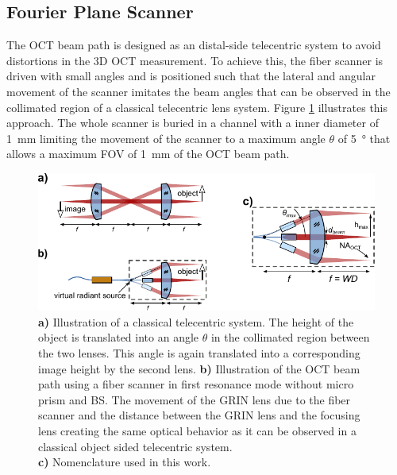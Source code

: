 \subsection{Fourier Plane Scanner}



The OCT beam path is designed as an distal-side telecentric system to avoid distortions in the 3D OCT measurement. To achieve this, the fiber scanner is driven with small angles and is positioned such that the lateral and angular movement of the scanner imitates the beam angles that can be observed in the collimated region of a classical telecentric lens system. Figure \ref{fig:fps} illustrates this approach. The whole scanner is buried in a channel with a inner diameter of \SI{1}{\milli\meter} limiting the movement of the scanner to a maximum angle $\theta$ of \SI{5}{\degree} that allows a maximum FOV of \SI{1}{\milli\meter} of the OCT beam path.



\begin{figure}[h!]\centering \includegraphics[width=\columnwidth]{figures/30_DesignSimulation/fps.pdf}
      \caption{\textbf{a)} Illustration of a classical telecentric system. The height of the object is translated into an angle $\theta$ in the collimated region between the two lenses. This angle is again translated into a corresponding image height by the second lens.
      \textbf{b)} Illustration of the OCT beam path using a fiber scanner in first resonance mode without micro prism and BS. The movement of the GRIN lens due to the fiber scanner and the distance between the GRIN lens and the focusing lens creating the same optical behavior as it can be observed in a classical object sided telecentric system. \\ \textbf{c)} Nomenclature used in this work.}
      \label{fig:fps}
\end{figure}

